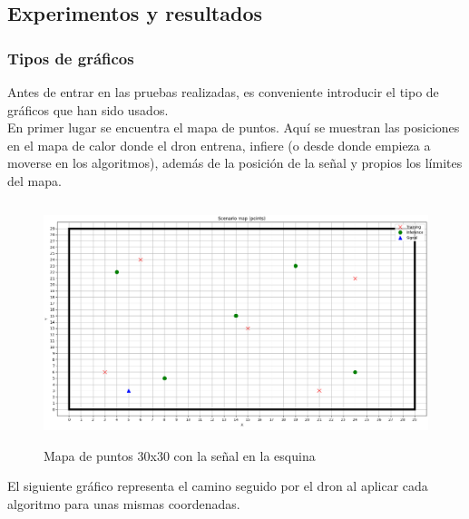 \subsection{Experimentos y resultados}
\label{subsec:experimentos_sf}

\subsubsection{Tipos de gráficos}
\label{subsubsec:graficos}

Antes de entrar en las pruebas realizadas, es conveniente introducir el tipo de gráficos que han sido usados.\\

En primer lugar se encuentra el mapa de puntos. Aquí se muestran las posiciones en el mapa de calor donde el dron entrena, infiere (o desde donde empieza a moverse en los algoritmos), además de la posición de la señal y propios los límites del mapa.\\

\begin{figure} [H]
    \begin{center}
    \includegraphics[height=7cm]{imagenes/cap4/12_puntos_30_esquina.png}
    \end{center}
    \caption[Mapa de puntos 30x30 con la señal en la esquina]{Mapa de puntos 30x30 con la señal en la esquina}
    \label{fig:30_points}
\end{figure}

El siguiente gráfico representa el camino seguido por el dron al aplicar cada algoritmo para unas mismas coordenadas.\\

